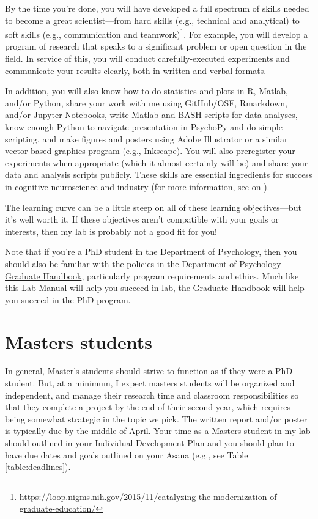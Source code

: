 \documentclass[letterpaper,11pt,oneside]{memoir}
\begin{document}
By the time you're done, you will have developed a full spectrum of skills needed to become a great scientist---from hard skills (e.g., technical and analytical) to soft skills (e.g., communication and teamwork)\footnote{\url{https://loop.nigms.nih.gov/2015/11/catalyzing-the-modernization-of-graduate-education/}}. For example, you will develop a program of research that speaks to a significant problem or open question in the field. In service of this, you will conduct carefully-executed experiments and communicate your results clearly, both in written and verbal formats. 

In addition, you will also know how to do statistics and plots in R, Matlab, and/or Python, share your work with me using GitHub/OSF, Rmarkdown, and/or Jupyter Notebooks, write Matlab and BASH scripts for data analyses, know enough Python to navigate presentation in PsychoPy and do simple scripting, and make figures and posters using Adobe Illustrator or a similar vector-based graphics program (e.g., Inkscape). You will also preregister your experiments when appropriate (which it almost certainly will be) and share your data and analysis scripts publicly. These skills are essential ingredients for success in cognitive neuroscience and industry (for more information, see  on ).

The learning curve can be a little steep on all of these learning objectives---but it's well worth it. If these objectives aren't compatible with your goals or interests, then my lab is probably not a good fit for you!

Note that if you're a PhD student in the Department of Psychology, then you should also be familiar with the policies in the \href{https://docs.google.com/document/d/1hoxVN1ol7ZGB10_9N0k8yVxkRDJLcMVYGTp-Nwgbm94/edit}{Department of Psychology Graduate Handbook}, particularly program requirements and ethics. Much like this Lab Manual will help you succeed in lab, the Graduate Handbook will help you succeed in the PhD program.


\section{Masters students}

In general, Master's students should strive to function as if they were a PhD student. But, at a minimum, I expect masters students will be organized and independent, and manage their research time and classroom responsibilities so that they complete a project by the end of their second year, which requires being somewhat strategic in the topic we pick. The written report and/or poster is typically due by the middle of April. Your time as a Masters student in my lab should outlined in your Individual Development Plan and you should plan to have due dates and goals outlined on your Asana (e.g., see Table \ref{table:deadlines}).
\end{document}
